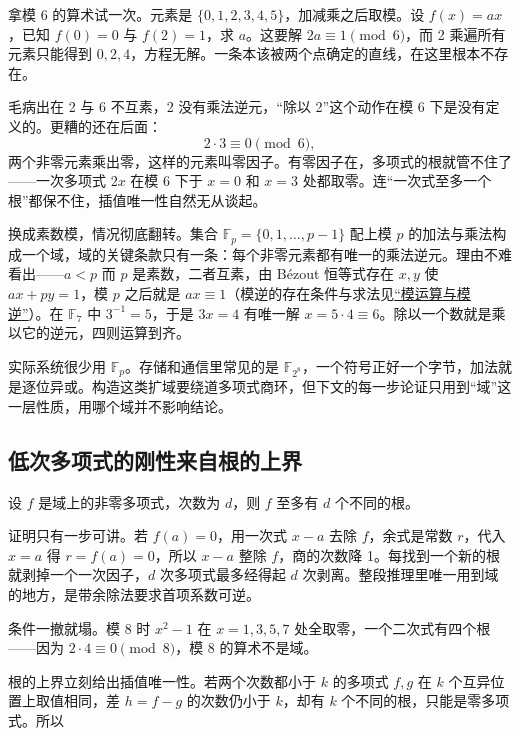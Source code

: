 拿模 6 的算术试一次。元素是 \(\{0,1,2,3,4,5\}\)，加减乘之后取模。设 \(f(x)=ax\)，已知 \(f(0)=0\) 与 \(f(2)=1\)，求 \(a\)。这要解 \(2a\equiv1\pmod 6\)，而 2 乘遍所有元素只能得到 \(0,2,4\)，方程无解。一条本该被两个点确定的直线，在这里根本不存在。

毛病出在 2 与 6 不互素，2 没有乘法逆元，``除以 2''这个动作在模 6 下是没有定义的。更糟的还在后面：
\[
2\cdot 3\equiv 0\pmod 6 ,
\]
两个非零元素乘出零，这样的元素叫零因子。有零因子在，多项式的根就管不住了——一次多项式 \(2x\) 在模 6 下于 \(x=0\) 和 \(x=3\) 处都取零。连``一次式至多一个根''都保不住，插值唯一性自然无从谈起。

换成素数模，情况彻底翻转。集合 \(\mathbb F_p=\{0,1,\ldots,p-1\}\) 配上模 \(p\) 的加法与乘法构成一个域，域的关键条款只有一条：每个非零元素都有唯一的乘法逆元。理由不难看出——\(a<p\) 而 \(p\) 是素数，二者互素，由 Bézout 恒等式存在 \(x,y\) 使 \(ax+py=1\)，模 \(p\) 之后就是 \(ax\equiv1\)（模逆的存在条件与求法见\hyperref[sec:04-Discrete-Mathematics/04-Number-Theory/02]{``模运算与模逆''}）。在 \(\mathbb F_7\) 中 \(3^{-1}=5\)，于是 \(3x=4\) 有唯一解 \(x=5\cdot4\equiv6\)。除以一个数就是乘以它的逆元，四则运算到齐。

实际系统很少用 \(\mathbb F_p\)。存储和通信里常见的是 \(\mathbb F_{2^8}\)，一个符号正好一个字节，加法就是逐位异或。构造这类扩域要绕道多项式商环，但下文的每一步论证只用到``域''这一层性质，用哪个域并不影响结论。

\subsection{低次多项式的刚性来自根的上界}

\begin{proposition}
设 \(f\) 是域上的非零多项式，次数为 \(d\)，则 \(f\) 至多有 \(d\) 个不同的根。
\end{proposition}

证明只有一步可讲。若 \(f(a)=0\)，用一次式 \(x-a\) 去除 \(f\)，余式是常数 \(r\)，代入 \(x=a\) 得 \(r=f(a)=0\)，所以 \(x-a\) 整除 \(f\)，商的次数降 1。每找到一个新的根就剥掉一个一次因子，\(d\) 次多项式最多经得起 \(d\) 次剥离。整段推理里唯一用到域的地方，是带余除法要求首项系数可逆。

条件一撤就塌。模 8 时 \(x^2-1\) 在 \(x=1,3,5,7\) 处全取零，一个二次式有四个根——因为 \(2\cdot4\equiv0\pmod 8\)，模 8 的算术不是域。

根的上界立刻给出插值唯一性。若两个次数都小于 \(k\) 的多项式 \(f,g\) 在 \(k\) 个互异位置上取值相同，差 \(h=f-g\) 的次数仍小于 \(k\)，却有 \(k\) 个不同的根，只能是零多项式。所以

